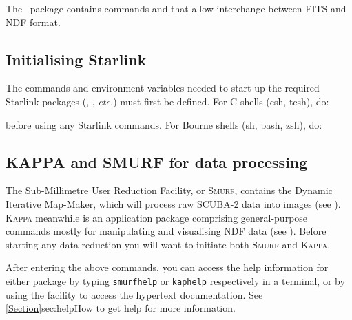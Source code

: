 The \convert\ package contains commands  and
 that allow interchange between FITS
and NDF format.

\subsection{Initialising Starlink}
\label{sec:starinit}

The commands and environment variables needed to start up the required
Starlink packages (\smurf \cite{smurf}, \Kappa, \emph{etc.}) must first
be defined. For C shells (csh, tcsh), do:

\begin{terminalv}
\end{terminalv}

before using any Starlink commands. For Bourne shells (sh, bash, zsh), do:

\begin{terminalv}
\end{terminalv}

\subsection{KAPPA and SMURF for data processing}
\label{sec:packinit}

The Sub-Millimetre User Reduction Facility, or \textsc{Smurf},
contains the Dynamic Iterative Map-Maker, which will process raw
SCUBA-2 data into images (see \smurfsun). \textsc{Kappa} meanwhile is
an application package comprising general-purpose commands mostly for
manipulating and visualising NDF data (see \kappasun). Before starting
any data reduction you will want to initiate both \textsc{Smurf} and
\textsc{Kappa}.

\begin{terminalv}
\end{terminalv}

After entering the above commands, you can access the help information
for either package by typing \texttt{smurfhelp} or
\texttt{kaphelp} respectively in a terminal, or by using the
 facility to access the hypertext documentation. See
\cref{Section}{sec:help}{How to get help} for more information.



